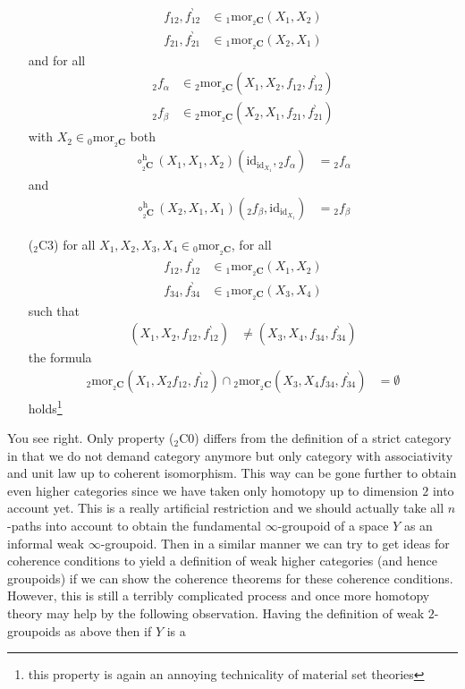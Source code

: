\begin{enumerate}
\begin{align*}
  f_{12},f_{12}^{\backprime}
  &\in
  {}_{1}\mathrm{mor}_{{}_{2}\mathbf{C}}(X_{1},X_{2})
  \\
  f_{21},f_{21}^{\backprime}
  &\in
  {}_{1}\mathrm{mor}_{{}_{2}\mathbf{C}}(X_{2},X_{1})
\end{align*}
and for all
\begin{align*}
  {}_{2}f_{\alpha}
  &\in
  {}_{2}\mathrm{mor}_{{}_{2}\mathbf{C}}(X_{1},X_{2},f_{12},f_{12}^{\backprime})
  \\
  {}_{2}f_{\beta}
  &\in
  {}_{2}\mathrm{mor}_{{}_{2}\mathbf{C}}(X_{2},X_{1},f_{21},f_{21}^{\backprime})
\end{align*}
with $X_{2} \in {}_{0}\mathrm{mor}_{{}_{2}\mathbf{C}}$ both
\begin{align*}
  \circ_{{}_{2}\mathbf{C}}^{\textrm{h}}
  (X_{1},X_{1},X_{2})
  (\mathrm{id}_{\mathrm{id}_{X_{1}}},{}_{2}f_{\alpha})
  &=
  {}_{2}f_{\alpha}
\end{align*}
and
\begin{align*}
  \circ_{{}_{2}\mathbf{C}}^{\textrm{h}}
  (X_{2},X_{1},X_{1})
  ({}_{2}f_{\beta},\mathrm{id}_{\mathrm{id}_{X_{1}}})
  &=
  {}_{2}f_{\beta}
\end{align*}
\item[(${}_{2}$C3)]
for all $X_{1},X_{2},X_{3},X_{4} \in {}_{0}\mathrm{mor}_{{}_{2}\mathbf{C}}$, for all
\begin{align*}
  f_{12},f_{12}^{\backprime}
  &\in
  {}_{1}\mathrm{mor}_{{}_{2}\mathbf{C}}(X_{1},X_{2})
  \\
  f_{34},f_{34}^{\backprime}
  &\in
  {}_{1}\mathrm{mor}_{{}_{2}\mathbf{C}}(X_{3},X_{4})
\end{align*}
such that
\begin{align*}
  (X_{1},X_{2},f_{12},f_{12}^{\backprime})
  &\neq
  (X_{3},X_{4},f_{34},f_{34}^{\backprime})
\end{align*}
the formula
\begin{align*}
  {}_{2}\mathrm{mor}_{{}_{2}\mathbf{C}}(X_{1},X_{2}f_{12},f_{12}^{\backprime})
  \cap
  {}_{2}\mathrm{mor}_{{}_{2}\mathbf{C}}(X_{3},X_{4}f_{34},f_{34}^{\backprime})
  &=
  \emptyset
\end{align*}
holds\footnote{this property is again an annoying technicality of material set theories}
\end{enumerate}
You see right. Only property (${}_{2}$C0) differs from the definition of a strict category in that we do not demand category anymore but only category with associativity and unit law up to coherent isomorphism. This way can be gone further to obtain even higher categories since we have taken only homotopy up to dimension $2$ into account yet. This is a really artificial restriction and we should actually take all $n$-paths into account to obtain the fundamental $\infty$-groupoid of a space $Y$ as an informal weak $\infty$-groupoid. Then in a similar manner we can try to get ideas for coherence conditions to yield a definition of weak higher categories (and hence groupoids) if we can show the coherence theorems for these coherence conditions. However, this is still a terribly complicated process and once more homotopy theory may help by the following observation. Having the definition of weak $2$-groupoids as above then if $Y$ is a
